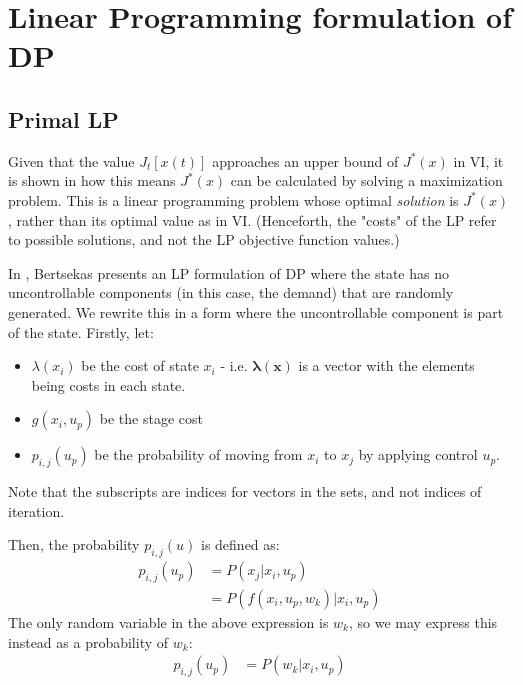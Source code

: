 \documentclass[conference]{IEEEtran}
\begin{document}


\section{Linear Programming formulation of DP}
\subsection{Primal LP}
Given that the value $J_{t}[x(t)]$ approaches an upper bound of $J^{*}(x)$ in VI, it is shown in \cite{Bertsekas:2007:DPO:1396348} how this means $J^{*}(x)$ can be calculated by solving a maximization problem. This is a linear programming problem whose optimal \textit{solution} is $J^{*}(x)$, rather than its optimal value as in VI. (Henceforth, the "costs" of the LP refer to possible solutions, and not the LP objective function values.)


In \cite{Bertsekas:2007:DPO:1396348}, Bertsekas presents an LP formulation of DP where the state has no uncontrollable components (in this case, the demand) that are randomly generated. We rewrite this in a form where the uncontrollable component is part of the state. Firstly, let:
\begin{itemize}
	\item $\lambda(x_{i})$ be the cost of state $x_{i}$ - i.e. $\boldsymbol{\lambda(x)}$ is a vector with the elements being costs in each state.
	\item $g(x_{i},u_{p})$ be the stage cost
	\item $p_{i,j}(u_{p})$ be the probability of moving from $x_{i}$ to $x_{j}$ by applying control $u_{p}$.
\end{itemize} Note that the subscripts are indices for vectors in the sets, and not indices of iteration.

Then, the probability $p_{i,j}(u)$ is defined as: \begin{align*} 
p_{i,j}(u_{p})&= P(x_{j}| x_{i},u_{p})\\ 
&= P(f(x_{i},u_{p},w_{k})| x_{i},u_{p})
\end{align*} The only random variable in the above expression is $w_{k}$, so we may express this instead as a probability of $w_{k}$:
\begin{align*} 
    p_{i,j}(u_{p})&= P(w_{k} | x_{i},u_{p})
\end{align*}
\end{document}
